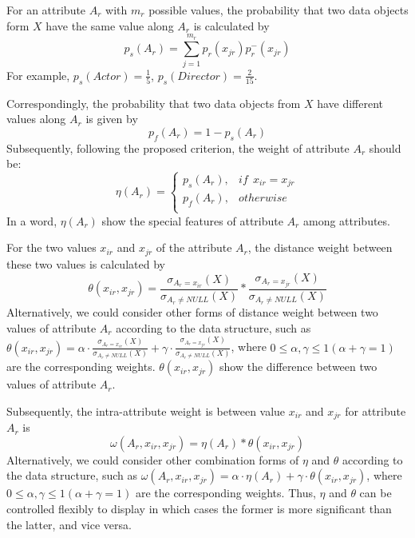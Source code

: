 \documentclass[review]{elsarticle}
\begin{document}
For an attribute $A_r$ with $m_r$ possible values, the probability that two data objects form $X$ have the same value along $A_r$ is calculated by
\begin{equation}
p_s(A_r) = \sum_{j=1}^{m_r}p_r(x_{jr})p_r^-(x_{jr})
\label{equ5}
\end{equation}
For example, $p_s(Actor) = \frac{1}{5}$, $p_s(Director) = \frac{2}{15}$.

Correspondingly, the probability that two data objects from $X$ have different values along $A_r$ is given by
\begin{equation}
p_f(A_r) = 1 - p_s(A_r)
\label{equ6}
\end{equation}
Subsequently, following the proposed criterion, the weight of attribute $A_r$ should be:
\begin{equation}
\label{equ7}
\eta(A_r)=
\left\{\begin{array}{cc}
  p_s(A_r), & if\ \ x_{ir} = x_{jr} \\
  p_f(A_r), & otherwise \\
  \end{array} \right.
\end{equation}
In a word, $\eta(A_r)$ show the special features of attribute $A_r$ among attributes.

For the two values $x_{ir}$ and $x_{jr}$ of the attribute $A_r$, the distance weight between these two values is calculated by
\begin{equation}
\theta(x_{ir},x_{jr}) = \frac{\sigma_{A_r = x_{ir}}(X)}{\sigma_{A_r \neq NULL}(X)} * \frac{\sigma_{A_r = x_{jr}}(X)}{\sigma_{A_r \neq NULL}(X)}
\label{equ8}
\end{equation}
Alternatively, we could consider other forms of distance weight between two values of attribute $A_r$ according to the data structure, such as $\theta(x_{ir},x_{jr}) = \alpha \cdot \frac{\sigma_{A_r = x_{ir}}(X)}{\sigma_{A_r \neq NULL}(X)} + \gamma \cdot \frac{\sigma_{A_r = x_{jr}}(X)}{\sigma_{A_r \neq NULL}(X)}$, where $0 \leq \alpha,\gamma \leq 1 (\alpha+\gamma = 1)$ are the corresponding weights. $\theta(x_{ir},x_{jr})$ show the difference between two values of attribute $A_r$.

Subsequently, the intra-attribute weight is between value $x_{ir}$ and $x_{jr}$ for attribute $A_r$ is
\begin{equation}
\label{equ9}
\omega(A_r,x_{ir},x_{jr})= \eta(A_r) * \theta(x_{ir},x_{jr})
\end{equation}
Alternatively, we could consider other combination forms of $\eta$ and $\theta$ according to the data structure, such as $\omega(A_r,x_{ir},x_{jr})= \alpha \cdot \eta(A_r) + \gamma \cdot \theta(x_{ir},x_{jr})$, where $0 \leq \alpha,\gamma \leq 1 (\alpha+\gamma = 1)$ are the corresponding weights. Thus, $\eta$ and $\theta$ can be controlled flexibly to display in which cases the former is more significant than the latter, and vice versa.
\end{document}
